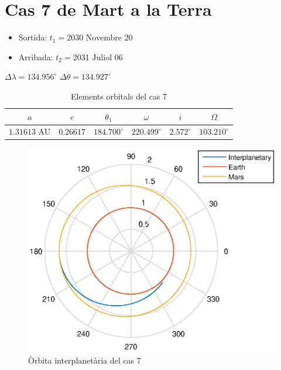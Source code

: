 \section{Cas 7 de Mart a la Terra}
\begin{itemize}
	\item Sortida: $t_{1}=$2030 Novembre 20
	\item Arribada: $t_{2}=$2031 Juliol 06
\end{itemize}
$\Delta\lambda=134.956^{\circ}$
$\Delta\theta=134.927^{\circ}$
\begin{table}[h!]
	\centering
	\begin{tabular}{ |c|c|c|c|c|c|}
		\hline
		$a$ & $e$ & $\theta_{1}$ & $\omega$ & $i$ & $\Omega$ \\ \hline
		$1.31613$ AU  & $0.26617$ & $184.700^{\circ}$ & $220.499^{\circ}$ & $2.572^{\circ}$ & $103.210^{\circ}$ \\ \hline
	\end{tabular}
	\caption{Elements orbitals del cas 7}
\end{table}
\begin{figure}[H]
	\centering
	\includegraphics[scale=0.95]{./plots/cas7}
	\caption{Òrbita interplanetària del cas 7}
\end{figure}

